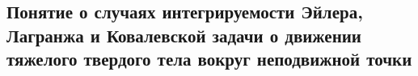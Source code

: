 

\subsection{Понятие о случаях интегрируемости Эйлера, Лагранжа и Ковалевской задачи о движении тяжелого твердого тела вокруг неподвижной точки}




